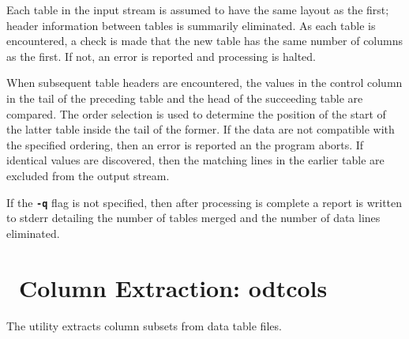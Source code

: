 Each table in the input stream is assumed to have the same layout as
the first; header information between tables is summarily eliminated.
As each table is encountered, a check is made that the new table has
the same number of columns as the first.  If not, an error is reported
and processing is halted.

When subsequent table headers are encountered, the values in the
control column in the tail of the preceding table and the head of the
succeeding table are compared.  The order selection is used to
determine the position of the start of the latter table inside the
tail of the former.  If the data are not compatible with the specified
ordering, then an error is reported an the program aborts.  If
identical values are discovered, then the matching lines in the
earlier table are excluded from the output stream.

If the \texttt{\textbf{-q}} flag is not specified, then after
processing is complete a report is written to stderr detailing the
number of tables merged and the number of data lines eliminated.


\section{\ODT\ Column Extraction: odtcols}\label{sec:odtcols}%

The  utility extracts column
subsets from  data
table files.

